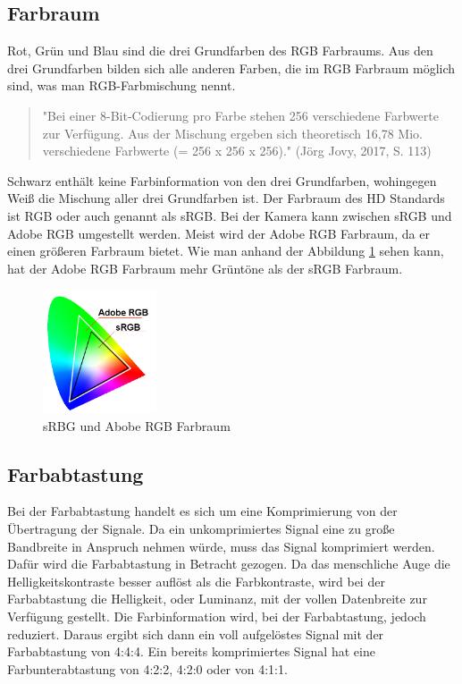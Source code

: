 \subsection{Farbraum}
Rot, Grün und Blau sind die drei Grundfarben des RGB Farbraums. Aus den drei Grundfarben bilden sich alle anderen Farben, die im RGB Farbraum möglich sind, was man RGB-Farbmischung nennt.\begin{quote}"Bei einer 8-Bit-Codierung pro Farbe stehen 256 verschiedene Farbwerte zur Verfügung. Aus der Mischung ergeben sich theoretisch 16,78 Mio. verschiedene Farbwerte (= 256 x 256 x 256)." (Jörg Jovy, 2017, S. 113)\end{quote} Schwarz enthält keine Farbinformation von den drei Grundfarben, wohingegen Weiß die Mischung aller drei Grundfarben ist. Der Farbraum des HD Standards ist RGB oder auch genannt als sRGB. Bei der Kamera kann zwischen sRGB und Adobe RGB umgestellt werden. Meist wird der Adobe RGB Farbraum, da er einen größeren Farbraum bietet. Wie man anhand der Abbildung \ref{fig:abb16} sehen kann, hat der Adobe RGB Farbraum mehr Grüntöne als der sRGB Farbraum.\citep{farbraum}
\begin{figure}[H]
\centering
	\includegraphics[width=0.3\textwidth]{abb16}
	\caption[sRBG und Abobe RGB Farbraum]{sRBG und Abobe RGB Farbraum\footnotemark}\label{fig:abb16}
\end{figure}
\subsection{Farbabtastung}
Bei der Farbabtastung handelt es sich um eine Komprimierung von  der Übertragung der Signale. Da ein unkomprimiertes Signal eine zu große Bandbreite in Anspruch nehmen würde, muss das Signal komprimiert werden. Dafür wird die Farbabtastung in Betracht gezogen. Da das menschliche Auge die Helligkeitskontraste besser auflöst als die Farbkontraste, wird bei der Farbabtastung die Helligkeit, oder Luminanz, mit der vollen Datenbreite zur Verfügung gestellt. Die Farbinformation wird, bei der Farbabtastung, jedoch reduziert. Daraus ergibt sich dann ein voll aufgelöstes Signal mit der Farbabtastung von 4:4:4. Ein bereits komprimiertes Signal hat eine Farbunterabtastung von 4:2:2, 4:2:0 oder von 4:1:1.\citep{farbabtastung}
